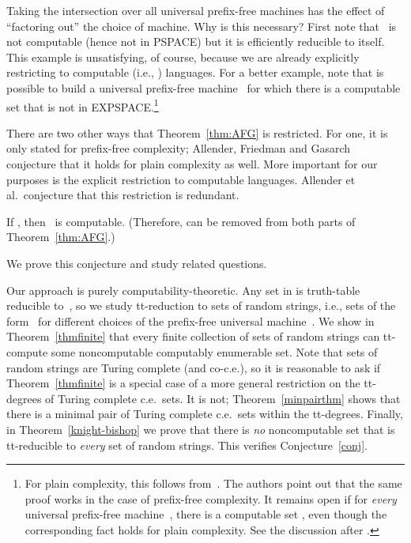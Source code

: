 \documentclass{LMCS}
\newcommand{\0}{\mathbf{0}}
\newcommand{\ce}{c.e.\ }
\newcommand{\<}{\langle}
\renewcommand{\>}{\rangle}
\begin{document}
Taking the intersection over all universal prefix-free machines has the
effect of ``factoring out'' the choice of machine. Why is this necessary?
First note that~ is not computable (hence not in PSPACE) but it is
efficiently reducible to itself. This example is unsatisfying, of course,
because we are already explicitly restricting to computable (i.e.,
) languages. For a better example, note that is possible to build
a universal prefix-free machine~ for which there is a computable set  that is not in EXPSPACE.\footnote{For plain
complexity, this follows from~\cite[Theorem~12]{ABK:06}. The authors point
out that the same proof works in the case of prefix-free complexity. It
remains open if for \emph{every} universal prefix-free machine~, there is
a computable set
, even
though the corresponding fact holds for plain complexity. See the discussion
after \cite[Theorem~16]{ABK:06}.}

There are two other ways that Theorem~\ref{thm:AFG} is restricted. For one,
it is only stated for prefix-free complexity; Allender, Friedman and
Gasarch~\cite{AFG} conjecture that it holds for plain complexity as well.
More important for our purposes is the explicit restriction to computable
languages. Allender et al.\ conjecture that this restriction is redundant.

\begin{conj}\label{conj}
If , then~ is computable.
(Therefore,  can be removed from both parts of
Theorem~\ref{thm:AFG}.)
\end{conj}

\noindent We prove this conjecture and study related questions.

Our approach is purely computability-theoretic. Any set in 
is truth-table reducible to~, so we study tt-reduction to sets of random
strings, i.e., sets of the form~ for different choices of the
prefix-free universal machine~. We show in Theorem~\ref{thmfinite} that
every finite collection of sets of random strings can tt-compute some
noncomputable computably enumerable set. Note that sets of random strings are
Turing complete (and co-c.e.), so it is reasonable to ask if
Theorem~\ref{thmfinite} is a special case of a more general restriction on
the tt-degrees of Turing complete \ce sets. It is not;
Theorem~\ref{minpairthm} shows that there is a minimal pair of Turing
complete \ce sets within the tt-degrees. Finally, in
Theorem~\ref{knight-bishop} we prove that there is \emph{no} noncomputable
set that is tt-reducible to \emph{every} set of random strings. This verifies
Conjecture~\ref{conj}.
\end{document}
